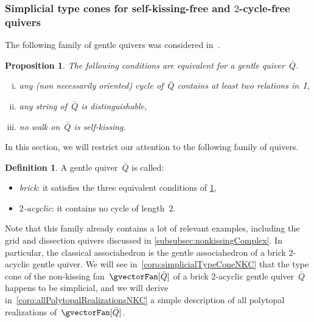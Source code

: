 \documentclass{amsart}
\newtheorem{proposition}[theorem]{Proposition}
\theoremstyle{definition}
\newtheorem{definition}[theorem]{Definition}
\newcommand{\darkblue}{\color{darkblue}} %
\newcommand{\defn}[1]{\textsl{\darkblue #1}} %
\newcommand{\quiver}{\bar Q} %
\begin{document}
\subsubsection{Simplicial type cones for self-kissing-free and $2$-cycle-free quivers}
\label{subsubsec:simplicialTypeConeNKC}

The following family of gentle quivers was considered in~\cite[Sect.~4]{GarverMcConvilleMousavand}.

\begin{proposition}
\label{prop:noSelfKissing}
The following conditions are equivalent for a gentle quiver~$\quiver$.
\begin{enumerate}[(i)]
\item any (non necessarily oriented) cycle of~$\quiver$ contains at least two relations in~$I$,
\item any string of~$\quiver$ is distinguishable,
\item no walk on~$\quiver$ is self-kissing.
\end{enumerate}
\end{proposition}

In this section, we will restrict our attention to the following family of quivers.

\begin{definition}
A gentle quiver~$\quiver$ is called:
\begin{itemize}
\item \defn{brick}: it satisfies the three equivalent conditions of \cref{prop:noSelfKissing},
\item \defn{$2$-acyclic}: it contains no cycle of length~$2$.
\end{itemize}
\end{definition}

Note that this family already contains a lot of relevant examples, including the grid and dissection quivers discussed in \cref{subsubsec:nonkissingComplex}.
In particular, the classical associahedron is the gentle associahedron of a brick $2$-acyclic gentle quiver.
We will see in~\cref{coro:simplicialTypeConeNKC} that the type cone of the non-kissing fan~$\gvectorFan[\quiver]$ of a brick $2$-acyclic gentle quiver~$\quiver$ happens to be simplicial, and we will derive in~\cref{coro:allPolytopalRealizationsNKC} a simple description of all polytopal realizations of~$\gvectorFan[\quiver]$.
\end{document}
